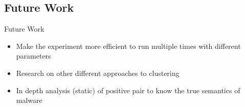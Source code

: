 \documentclass[]{beamer}
\begin{document}
\subsection{Future Work}
\label{sub:Future Work}
\begin{frame}[t]{Future Work}
  \begin{itemize}
    \item Make the experiment more efficient to run multiple times with different parameters
    \item Research on other different approaches to clustering
    \item In depth analysis (static) of positive pair to know the true semantics of malware
  \end{itemize}
\end{frame}
\end{document}
